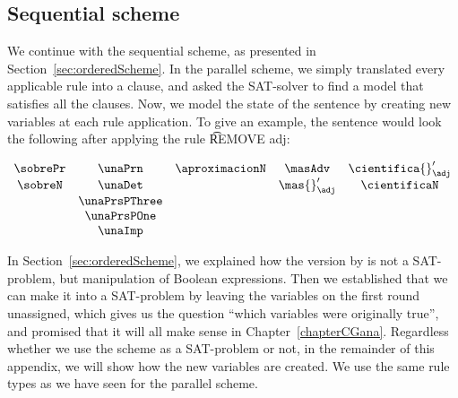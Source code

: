\subsection{Sequential scheme}


We continue with the sequential scheme, as presented in Section~\ref{sec:orderedScheme}.
In the parallel scheme, we simply translated every applicable rule into a clause, and asked the SAT-solver to find a model that satisfies all the clauses. 
Now, we model the state of the sentence by creating new variables at each rule application. 
To give an example, the sentence would look the following after applying the rule \t{REMOVE adj}:

\begin{equation}
\begin{array}{c c c c c}
\sobrePr & \unaPrn & \aproximacionN & \masAdv      & \cientifica{}'_\adj \\
\sobreN  & \unaDet &                & \mas{}'_\adj & \cientificaN \\
         & \unaPrsPThree \\
         & \unaPrsPOne \\
         & \unaImp \\
\end{array}
\end{equation}

In Section~\ref{sec:orderedScheme}, we explained how the version by \cite{lager_nivre01} is not a SAT-problem, but manipulation of Boolean expressions.
Then we established that we can make it into a SAT-problem by leaving the variables on the first round unassigned, which gives us the question ``which variables were originally true'', and promised that it will all make sense in Chapter~\ref{chapterCGana}. Regardless whether we use the scheme as a SAT-problem or not, in the remainder of this appendix, we will show how the new variables are created. 
We use the same rule types as we have seen for the parallel scheme.













